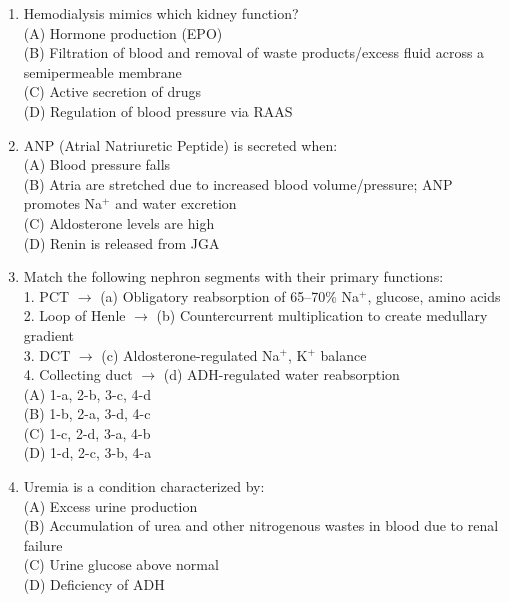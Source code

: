 \documentclass{article}
\begin{document}
\begin{enumerate}[label=Q\arabic*.]
\item Hemodialysis mimics which kidney function?
\\(A) Hormone production (EPO)
\\(B) Filtration of blood and removal of waste products/excess fluid across a semipermeable membrane
\\(C) Active secretion of drugs
\\(D) Regulation of blood pressure via RAAS

\item ANP (Atrial Natriuretic Peptide) is secreted when:
\\(A) Blood pressure falls
\\(B) Atria are stretched due to increased blood volume/pressure; ANP promotes Na$^+$ and water excretion
\\(C) Aldosterone levels are high
\\(D) Renin is released from JGA

\item Match the following nephron segments with their primary functions:\\
1. PCT $\rightarrow$ (a) Obligatory reabsorption of 65--70\% Na$^+$, glucose, amino acids\\
2. Loop of Henle $\rightarrow$ (b) Countercurrent multiplication to create medullary gradient\\
3. DCT $\rightarrow$ (c) Aldosterone-regulated Na$^+$, K$^+$ balance\\
4. Collecting duct $\rightarrow$ (d) ADH-regulated water reabsorption
\\(A) 1-a, 2-b, 3-c, 4-d
\\(B) 1-b, 2-a, 3-d, 4-c
\\(C) 1-c, 2-d, 3-a, 4-b
\\(D) 1-d, 2-c, 3-b, 4-a

\item Uremia is a condition characterized by:
\\(A) Excess urine production
\\(B) Accumulation of urea and other nitrogenous wastes in blood due to renal failure
\\(C) Urine glucose above normal
\\(D) Deficiency of ADH

\end{enumerate}
\end{document}
